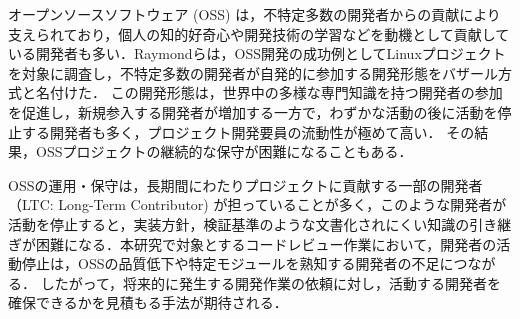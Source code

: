 \documentclass[submit,noauthor,ses,dvipdfmx]{ipsj}
\newcommand{\todo}[1]{\colorbox{yellow}{{\bf TODO}:}{\color{red} {\textbf{[#1]}}}}
\newcommand{\fixstart}{\color{magenta}}
\newcommand{\fixend}{\color{black}}
\begin{document}
オープンソースソフトウェア (OSS) は，不特定多数の開発者からの貢献により支えられており，個人の知的好奇心や開発技術の学習などを動機として貢献している開発者も多い\cite{motivation}．Raymondらは，OSS開発の成功例としてLinuxプロジェクトを対象に調査し，不特定多数の開発者が自発的に参加する開発形態を\fixstart バザール方式と名付けた\fixend \cite{bazzar}．
この開発形態は，世界中の多様な専門知識を持つ開発者の参加を促進し，新規参入する開発者が増加する一方で，わずかな活動の後に活動を停止する開発者も多く，プロジェクト開発要員の流動性が極めて高い\cite{dynamics}．%
その結果，OSSプロジェクトの継続的な保守が困難になることもある\cite{pinto_otc}．

OSSの運用・保守は，長期間にわたりプロジェクトに貢献する一部の開発者（LTC: Long-Term Contributor) が担っていることが多く，このような開発者が活動を停止すると，実装方針，検証基準のような文書化されにくい知識の引き継ぎが困難になる．本研究で対象とするコードレビュー作業において，開発者の活動停止は，OSSの品質低下や特定モジュールを熟知する開発者の不足につながる\cite{bacchelli}\cite{mcintosh}．
したがって，将来的に発生する開発作業の依頼に対し，活動する開発者を確保できるかを見積もる手法が期待される．
\end{document}
